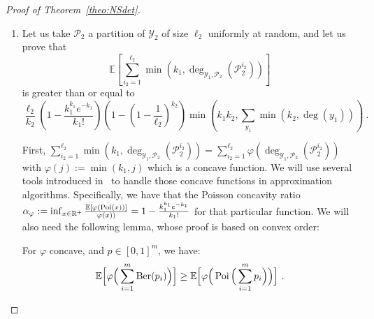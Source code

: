 \begin{proof}[Proof of Theorem~\ref{theo:NSdet}]
\begin{enumerate}
However the function $f : x \mapsto 1-\left(1-\frac{1}{\ell_1}\right)^x$ is nondecreasing concave with $f(0)=0$, so $\frac{f(x)}{x} \geq \frac{f(y)}{y}$ for $x \leq y$. In particular, we have that:
\[ f(\min(k_1,\deg_{\mathcal{Y}_1,\mathcal{P}_2}(\mathcal{P}_2^{i_2}))) \geq \frac{\min(k_1,\deg_{\mathcal{Y}_1,\mathcal{P}_2}(\mathcal{P}_2^{i_2})))}{k_1}f(k_1) \ , \]

and thus:
\begin{equation}
  \begin{aligned}
    \mathbb{E}_{\mathcal{P}_1}[e_{G_W}(\mathcal{P}_1,\mathcal{P}_2)] &\geq \ell_1\sum_{i_2=1}^{\ell_2}\left(1-\left(1-\frac{1}{\ell_1}\right)^{\min(k_1,\deg_{\mathcal{Y}_1,\mathcal{P}_2}(\mathcal{P}_2^{i_2}))}\right)\\
    &\geq \ell_1\frac{\sum_{i_2=1}^{\ell_2}\min(k_1,\deg_{\mathcal{Y}_1,\mathcal{P}_2}(\mathcal{P}_2^{i_2}))}{k_1}\left(1-\left(1-\frac{1}{\ell_1}\right)^{k_1}\right)\\
    &= \frac{\ell_1}{k_1}\left(1-\left(1-\frac{1}{\ell_1}\right)^{k_1}\right)\sum_{i_2=1}^{\ell_2}\min\left(k_1,\deg_{\mathcal{Y}_1,\mathcal{P}_2}(\mathcal{P}_2^{i_2})\right) \ ,
  \end{aligned}
\end{equation} 
which concludes the first part of the proof.
  
\item Let us take $\mathcal{P}_2$ a partition of $\mathcal{Y}_2$ of size $\ell_2$ uniformly at random, and let us prove that
  \[ \mathbb{E}\left[\sum_{i_2=1}^{\ell_2}\min\left(k_1,\deg_{\mathcal{Y}_1,\mathcal{P}_2}(\mathcal{P}_2^{i_2})\right)\right] \]
  is greater than or equal to
  \[ \frac{\ell_2}{k_2}\left(1 - \frac{k_1^{k_1}e^{-k_1}}{k_1!}\right)\left(1-\left(1-\frac{1}{\ell_2}\right)^{k_2}\right)\min\left(k_1k_2,\sum_{y_1}\min(k_2,\deg(y_1))\right) \ . \]

  First, $\sum_{i_2=1}^{\ell_2}\min\left(k_1,\deg_{\mathcal{Y}_1,\mathcal{P}_2}(\mathcal{P}_2^{i_2})\right) = \sum_{i_2=1}^{\ell_2}\varphi(\deg_{\mathcal{Y}_1,\mathcal{P}_2}(\mathcal{P}_2^{i_2}))$ with $\varphi(j):=\min(k_1,j)$ which is a concave function. We will use several tools introduced in~\cite{BFF21} to handle those concave functions in approximation algorithms. Specifically, we have that the Poisson concavity ratio $\alpha_{\varphi} := \inf_{x \in \mathbb{R}^+} \frac{\mathbb{E}[\varphi(\operatorname{\text{Poi}}(x))]}{\varphi(x))} = 1 - \frac{k_1^{k_1}e^{-k_1}}{k_1!}$ for that particular function. We will also need the following lemma, whose proof is based on convex order:
  \begin{lem}
    For $\varphi$ concave, and $p \in [0,1]^m$, we have:
    \[\mathbb{E}\Big[\varphi\Big(\sum_{i=1}^m\operatorname{\text{Ber}}(p_i)\Big)\Big] \geq \mathbb{E}\Big[\varphi\Big(\operatorname{\text{Poi}}\Big(\sum_{i=1}^m p_i\Big)\Big)\Big]\ .\]
  \label{lem:ConvexOrder}
\end{lem}
  

\end{enumerate}
\end{proof}
